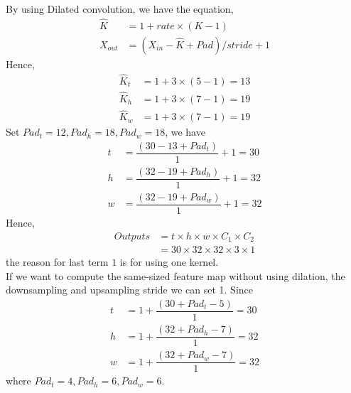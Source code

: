 \documentclass[12pt]{article}%
\begin{document}
By using Dilated convolution, we have the equation,
\begin{align*}
\hat{K} &= 1 + rate \times (K-1)\\
X_{out} &= (X_{in} - \hat{K} + Pad)/stride + 1
\end{align*}
Hence, 
\begin{align*}
\hat{K}_t &= 1 + 3\times(5-1)=13\\
\hat{K}_h &= 1 + 3\times(7-1)=19\\
\hat{K}_w &= 1 + 3\times(7-1)=19 
\end{align*}
Set $Pad_t = 12, Pad_h = 18, Pad_w = 18$,  we have
\begin{align*}
t &= \dfrac{(30 - 13 + Pad_t)}{1} + 1 = 30 \\
h &= \dfrac{(32 - 19 + Pad_h)}{1} + 1 = 32 \\
w &= \dfrac{(32 - 19 + Pad_w)}{1} + 1 = 32
\end{align*}
Hence, 
\begin{align*}
Outputs &= t \times h \times w \times C_1 \times C_2 \\
&= 30 \times 32 \times 32 \times 3 \times 1
\end{align*}
the reason for last term $1$ is for using one kernel. \\

If we want to compute the same-sized feature map without using dilation, the downsampling and upsampling stride we can set 1.
Since 
\begin{align*}
	t &= 1 + \dfrac{(30 + Pad_t - 5)}{1} = 30 \\
	h &= 1 + \dfrac{(32 + Pad_h - 7)}{1} = 32 \\
	w &= 1+ \dfrac{(32  + Pad_w - 7)}{1} = 32
\end{align*}
where $Pad_t = 4, Pad_h = 6, Pad_w =6$.
\newpage
\end{document}
